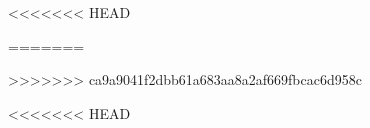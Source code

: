 \documentclass[12pt]{book}
\begin{document}
<<<<<<< HEAD
    \setcounter{page}{2}

=======
    \frontmatter
    
    
     
    
    
>>>>>>> ca9a9041f2dbb61a683aa8a2af669fbcac6d958c
    \singlespacing
    \tableofcontents
    \listoftables
    \listoffigures

<<<<<<< HEAD
    

    \printbibliography


\end{document}
